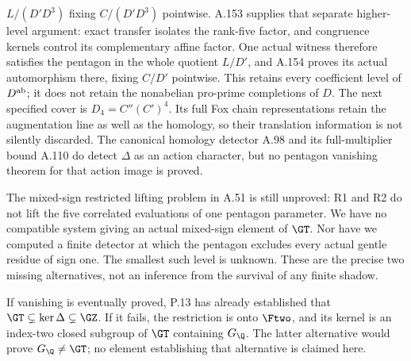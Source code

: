 $L/(D'D^3)$ fixing $C/(D'D^3)$ pointwise.
A.153 supplies that separate higher-level argument: exact
transfer isolates the rank-five factor, and congruence
kernels control its complementary affine factor. One
actual witness therefore satisfies the pentagon in the
whole quotient $L/D'$, and A.154 proves its actual
automorphism there, fixing $C/D'$ pointwise. This retains
every coefficient level of $D^{\rm ab}$; it does not
retain the nonabelian pro-prime completions of $D$.
The next specified cover is $D_4=C''(C')^4$. Its full
Fox chain representations retain the augmentation line
as well as the homology, so their translation information
is not silently discarded.
The canonical homology detector A.98 and its full-multiplier
bound A.110 do detect $\Delta$ as an action character, but no
pentagon vanishing theorem for that action image is proved.

The mixed-sign restricted lifting problem in A.51 is still
unproved: R1 and R2 do not lift the five correlated evaluations
of one pentagon parameter. We have no compatible system giving
an actual mixed-sign element of $\GT$. Nor have we computed a
finite detector at which the pentagon excludes every actual
gentle residue of sign one. The smallest such level is unknown.
These are the precise two missing alternatives, not an inference
from the survival of any finite shadow.

If vanishing is eventually proved, P.13 has already established
that $\GT\subsetneq\ker\Delta\subsetneq\GZ$.
If it fails, the restriction is onto $\Ftwo$, and its kernel is
an index-two closed subgroup of $\GT$ containing $G_{\Q}$.
The latter alternative would prove $G_{\Q}\ne\GT$; no element
establishing that alternative is claimed here.

